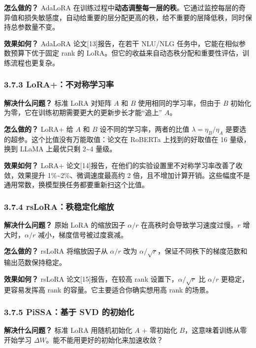 \documentclass[
  chinese,
]{ctexart}
\begin{document}
\textbf{怎么做的？} AdaLoRA
在训练过程中\textbf{动态调整每一层的秩}。它通过监控每层的奇异值和损失敏感度，自动给重要的层分配更高的秩，给不重要的层降低秩，同时保持总参数量不变。

\textbf{效果如何？} AdaLoRA 论文{[}13{]}报告，在若干 NLU/NLG
任务中，它能在相似参数预算下优于固定 rank 的
LoRA。但它的收益来自动态秩分配和重要性评估，训练流程也更复杂。

\subsubsection{3.7.3
LoRA+：不对称学习率}\label{loraux4e0dux5bf9ux79f0ux5b66ux4e60ux7387}

\textbf{解决什么问题？} 标准 LoRA 对矩阵 \(A\) 和 \(B\)
使用相同的学习率，但由于 \(B\)
初始化为零，它在训练初期需要更大的更新步长才能``追上'' \(A\)。

\textbf{怎么做的？} LoRA+ 给 \(A\) 和 \(B\) 设不同的学习率，两者的比值
\(\lambda = \eta_B / \eta_A\) 是要选的超参。这个比值没有万能取值：论文在
RoBERTa 上找到的好取值在 16 量级，换到 LLaMA 上最优只剩
2\textasciitilde4 量级。

\textbf{效果如何？} LoRA+
论文{[}14{]}报告，在他们的实验设置里不对称学习率改善了收敛，效果提升
1\%\textasciitilde2\%、微调速度最高约 2
倍，且不增加计算开销。这些幅度不是通用常数，换模型换任务都要重新扫这个比值。

\subsubsection{3.7.4
rsLoRA：秩稳定化缩放}\label{rsloraux79e9ux7a33ux5b9aux5316ux7f29ux653e}

\textbf{解决什么问题？} 原始 LoRA 的缩放因子 \(\alpha / r\)
在高秩时会导致学习速度过慢。\(r\) 增大时，\(\alpha / r\)
减小，梯度信号被过度衰减。

\textbf{怎么做的？} rsLoRA 将缩放因子从 \(\alpha / r\) 改为
\(\alpha / \sqrt{r}\)，保证不同秩下的梯度范数和输出范数保持稳定。

\textbf{效果如何？} rsLoRA 论文{[}15{]}报告，在较高 rank
设置下，\(\alpha/\sqrt{r}\) 比 \(\alpha/r\) 更稳定，更容易发挥高 rank
的容量。它主要适合你确实想用高 rank 的场景。

\subsubsection{3.7.5 PiSSA：基于 SVD
的初始化}\label{pissaux57faux4e8e-svd-ux7684ux521dux59cbux5316}

\textbf{解决什么问题？} 标准 LoRA 用随机初始化 \(A\) + 零初始化
\(B\)，这意味着训练从零开始学习
\(\Delta W\)。能不能用更好的初始化来加速收敛？
\end{document}
